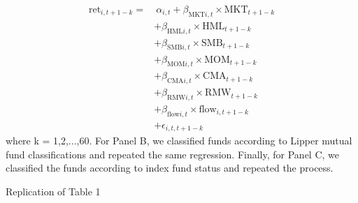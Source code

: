\documentclass{article}
\begin{document}
\begin{align*}
    \text{ret}_{i,t+1-k} = & \ \alpha_{i,t} + \beta_{\text{MKT} i,t} \times \text{MKT}_{t+1-k} \\
    & + \beta_{\text{HML} i,t} \times \text{HML}_{t+1-k} \\
    & + \beta_{\text{SMB} i,t} \times \text{SMB}_{t+1-k} \\
    & + \beta_{\text{MOM} i,t} \times \text{MOM}_{t+1-k} \\
    & + \beta_{\text{CMA} i,t} \times \text{CMA}_{t+1-k} \\
    & + \beta_{\text{RMW} i,t} \times \text{RMW}_{t+1-k} \\
    & + \beta_{\text{flow} i,t} \times \text{flow}_{i,t+1-k} \\
    & + \epsilon_{i,t,t+1-k}
\end{align*} 
where k = 1,2,...,60. For Panel B, we classified funds according to Lipper mutual fund classifications and 
repeated the same regression. Finally, for Panel C, we classified the funds according to index fund status and 
repeated the process. 


\begin{table}[ht]
    \centering
    \caption*{Replication of Table 1}
    \label{tab:table_complete}
      
\end{table}
    
\end{document}
